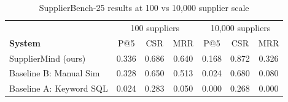 \begin{table}[h]
\centering
\caption{SupplierBench-25 results at 100 vs 10{,}000 supplier scale}
\label{tab:scale}
\begin{tabular}{lcccccc}
\hline
 & \multicolumn{3}{c}{100 suppliers} & \multicolumn{3}{c}{10{,}000 suppliers} \\
\textbf{System} & P@5 & CSR & MRR & P@5 & CSR & MRR \\
\hline
SupplierMind (ours) & 0.336 & 0.686 & 0.640 & 0.168 & 0.872 & 0.326 \\
Baseline B: Manual Sim & 0.328 & 0.650 & 0.513 & 0.024 & 0.680 & 0.080 \\
Baseline A: Keyword SQL & 0.024 & 0.283 & 0.050 & 0.000 & 0.268 & 0.000 \\
\hline
\end{tabular}
\end{table}